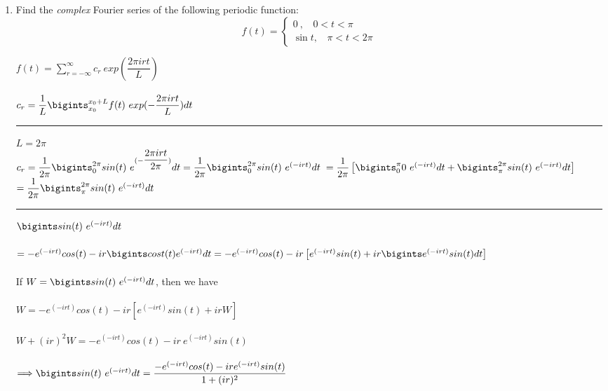 \documentclass[fleqn]{article}
\begin{document}
\begin{enumerate}
      
    \item Find the \emph{complex} Fourier series of the following periodic function: 
    \begin{equation}
      f(t)=\begin{cases}
      0~, ~~~~0< t < \pi \\
      \sin t, ~~~~\pi< t< 2 \pi
      \end{cases}
    \end{equation}

      \textcolor{hwColor}{
        $f(t)=\sum\limits_{r=-\infty}^{\infty} c_r~exp(\dfrac{2\pi irt}{L})$ \\
        \\
        $c_r=\dfrac{1}{L} \bigints_{x_0}^{x_0+L}f(t) ~ exp(-\dfrac{2\pi irt}{L}) dt$
      }

      \textcolor{hwColor}{ 
        \rule{15cm}{0.4pt} 
      }
      
      \textcolor{hwColor}{
        $L=2\pi$ \\
        $c_r=\dfrac{1}{2\pi} \bigints_{0}^{2\pi}sin(t) ~ e^{(-\dfrac{2\pi irt}{2\pi})} dt=\dfrac{1}{2\pi} \bigints_{0}^{2\pi}sin(t) ~ e^{(-irt)} dt$
        $=\dfrac{1}{2\pi} \left[\bigints_{0}^{\pi}0 ~ e^{(-irt)} dt+\bigints_{\pi}^{2\pi}sin(t) ~ e^{(-irt)} dt\right]$ \\
        $=\dfrac{1}{2\pi}\bigints_{\pi}^{2\pi}sin(t) ~ e^{(-irt)} dt$
      }

      \textcolor{hwColor}{ 
        \rule{15cm}{0.4pt} 
      }

      \textcolor{hwColor}{
        $\bigints sin(t) ~ e^{(-irt)} dt$ \\
        \\
        $=-e^{(-irt)} cos(t)-ir \bigints cost(t) e^{(-irt)} dt=-e^{(-irt)} cos(t)-ir\left[e^{(-irt)} sin(t)+ir \bigints e^{(-irt)} sin(t) dt\right]$ \\
        \\
        If $W=\bigints sin(t) ~ e^{(-irt)} dt$, then we have \\
        \\
        $W=-e^{(-irt)} cos(t)-ir\left[e^{(-irt)} sin(t)+ir W\right]$\\
        \\
        $W+(ir)^2W=-e^{(-irt)} cos(t)-ir ~ e^{(-irt)} sin(t)$\\
        \\
        $\Longrightarrow \bigints sin(t) ~ e^{(-irt)} dt=\dfrac{-e^{(-irt)} cos(t)-ire^{(-irt)} sin(t)}{1+(ir)^2}$
      }


\end{enumerate}
\end{document}
